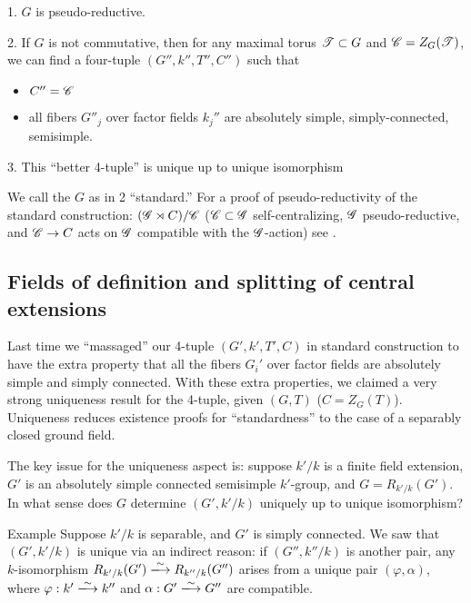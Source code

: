 \begin{theo}
1. $G$ is pseudo-reductive. 

2. If $G$ is not commutative, then for any maximal torus $\mathscr{T}\subset G$ and 
$\mathscr{C}=Z_G(\mathscr{T})$, we can find a four-tuple $(G'',k'',T'',C'')$ such that 
\begin{itemize}
  \item $C''=\mathscr{C}$
  \item all fibers $G''_j$ over factor fields $k_j''$ are absolutely simple, simply-connected, semisimple. 
\end{itemize}
3. This ``better 4-tuple'' is unique up to unique isomorphism 
\end{theo}
We call the $G$ as in 2 ``standard.'' 
For a proof of pseudo-reductivity of the standard construction: 
$(\mathscr{G}\rtimes C)/\mathscr{C}$ ($\mathscr{C}\subset \mathscr{G}$ self-centralizing, $\mathscr{G}$ 
pseudo-reductive, and $\mathscr{C}\to C$ acts on $\mathscr{G}$ compatible with the 
$\mathscr{G}$-action) see \cite[1.4.3]{cgp10}. 





\subsection{Fields of definition and splitting of central extensions}

Last time we ``massaged'' our 4-tuple $(G',k',T',C)$ in standard construction 
to have the extra property that all the fibers $G_i'$ over factor fields are 
absolutely simple and simply connected. With these extra properties, we claimed 
a very strong uniqueness result for the 4-tuple, given $(G,T)$ ($C=Z_G(T)$). 
Uniqueness reduces existence proofs for ``standardness'' to the case of a 
separably closed ground field. 

The key issue for the uniqueness aspect is: suppose $k'/k$ is a finite field 
extension, $G'$ is an absolutely simple connected semisimple $k'$-group, 
and $G=R_{k'/k}(G')$. In what sense does $G$ determine $(G',k'/k)$ uniquely 
up to unique isomorphism? 

\begin{enonce}[remark]{Example}
Suppose $k'/k$ is separable, and $G'$ is simply connected. We saw that 
$(G',k'/k)$ is unique via an indirect reason: if $(G'',k''/k)$ is another pair, 
any $k$-isomorphism $R_{k'/k}(G')\isomorphism R_{k''/k}(G'')$ arises from a 
unique pair $(\varphi,\alpha)$, where 
$\varphi:k'\isomorphism k''$ and $\alpha:G'\isomorphism G''$ are compatible. 
\end{enonce}

